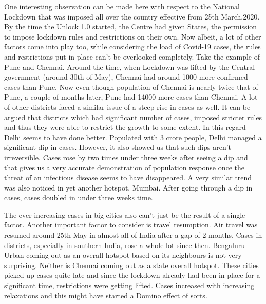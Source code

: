 \documentclass[letterpaper,12pt]{article}
\begin{document}
One interesting observation can be made here with respect to the National Lockdown that was imposed all over the country effective from 25th March,2020. By the time the Unlock 1.0 started, the Centre had given States, the permission to impose lockdown rules and restrictions on their own. Now albeit, a lot of other factors come into play too, while considering the load of Covid-19 cases, the rules and restrictions put in place can't be overlooked completely. Take the example of Pune and Chennai. Around the time, when Lockdown was lifted by the Central government (around 30th of May), Chennai had around 1000 more confirmed cases than Pune. Now even though population of Chennai is nearly twice that of Pune, a couple of months later, Pune had 14000 more cases than Chennai.  A lot of other districts faced a similar issue of a steep rise in cases as well. It can be argued that districts which had significant number of cases, imposed stricter rules and thus they were able to restrict the growth to some extent. In this regard Delhi seems to have done better. Populated with 3 crore people, Delhi managed a significant dip in cases. However, it also showed us that such dips aren't irreversible. Cases rose by two times under three weeks after seeing a dip and that gives us a very accurate demonstration of population response once the threat of an infectious disease seems to have disappeared. A very similar trend was also noticed in yet another hotspot, Mumbai. After going through a dip in cases, cases doubled in under three weeks time.

The ever increasing cases in big cities also can't just be the result of a single factor. Another important factor to consider is travel resumption. Air travel was resumed around 25th May in almost all of India after a gap of 2 months. Cases in districts, especially in southern India, rose a whole lot since then. Bengaluru Urban coming out as an overall hotspot based on its neighbours is not very surprising. Neither is Chennai coming out as a state overall hotspot. These cities picked up cases quite late and since the lockdown already had been in place for a significant time, restrictions were getting lifted. Cases increased with increasing relaxations and this might have started a Domino effect of sorts.
\end{document}
